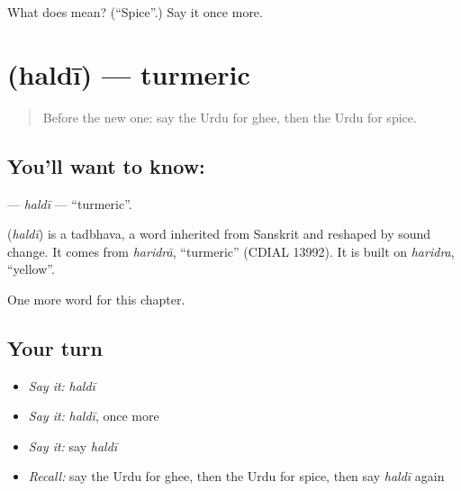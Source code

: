 \begin{tcolorbox}[breakable,colback=teal!4,colframe=teal!35!black,title={Before you move on}]
What does  mean? (\textquotedblleft{}Spice\textquotedblright{}.) Say it once more.
\end{tcolorbox}
\section[\texorpdfstring{\ur{ہلدی} (haldī)}{ہلدی (haldī)}]{ (haldī) — turmeric}

\label{lesson:UR-C199-haldi}



\begin{quote}
Before the new one: say the Urdu for ghee, then the Urdu for spice.
\end{quote}

\subsection*{You'll want to know: }
\textbf{} — \emph{haldī} — \textquotedblleft{}turmeric\textquotedblright{}.

\begin{cousinweb}
\textbf{} (\emph{haldī}) is a tadbhava, a word inherited from Sanskrit and reshaped by sound change. It comes from \emph{haridrā}, \textquotedblleft{}turmeric\textquotedblright{} (CDIAL 13992). It is built on \emph{haridra}, \textquotedblleft{}yellow\textquotedblright{}.
\end{cousinweb}

\begin{grammarlens}[title={What you've built}]
One more word for this chapter.
\end{grammarlens}

\subsection*{Your turn}
\begin{itemize}
\raggedright
  \item \emph{Say it:} \emph{haldī}
  \item \emph{Say it:} \emph{haldī}, once more
  \item \emph{Say it:} say \emph{haldī}
  \item \emph{Recall:} say the Urdu for ghee, then the Urdu for spice, then say \emph{haldī} again
\end{itemize}

